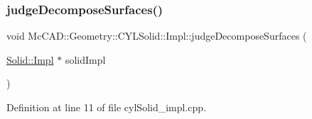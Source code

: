 \subsubsection{\texorpdfstring{judge\+Decompose\+Surfaces()}{judgeDecomposeSurfaces()}\hspace{0.1cm}{\footnotesize\ttfamily [1/2]}}
{\footnotesize\ttfamily void Mc\+C\+A\+D\+::\+Geometry\+::\+C\+Y\+L\+Solid\+::\+Impl\+::judge\+Decompose\+Surfaces (\begin{DoxyParamCaption}\item[{\hyperlink{classMcCAD_1_1Geometry_1_1Solid_1_1Impl}{Solid\+::\+Impl} $\ast$}]{solid\+Impl }\end{DoxyParamCaption})}



Definition at line 11 of file cyl\+Solid\+\_\+impl.\+cpp.


